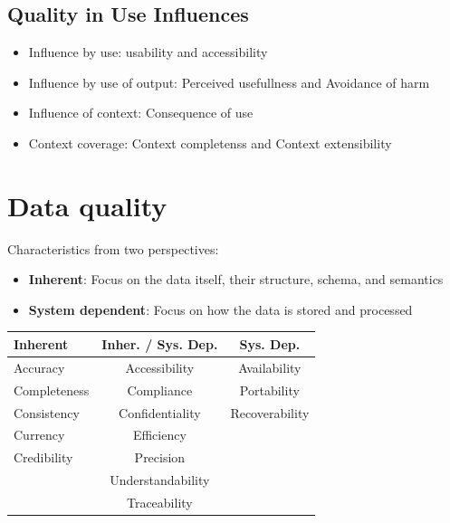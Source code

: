\subsection{Quality in Use Influences}
\begin{itemize}
  \item Influence by use: usability and accessibility
  \item Influence by use of output: Perceived usefullness and Avoidance of harm
  \item Influence of context: Consequence of use
  \item Context coverage: Context completenss and Context extensibility
\end{itemize}


\section{Data quality}
Characteristics from two perspectives:

\begin{itemize}
  \item \textbf{Inherent}: Focus on the data itself, their structure, schema, and semantics
  \item \textbf{System dependent}: Focus on how the data is stored and processed
\end{itemize}

\begin{table}[h!]
  \renewcommand{\arraystretch}{1.4}
  \centering
  \begin{tabular}{l c c}
    \toprule
    \textbf{Inherent} & \textbf{Inher. / Sys. Dep.} & \textbf{Sys. Dep.} \\
    \midrule
    Accuracy          & Accessibility               & Availability       \\
    Completeness      & Compliance                  & Portability        \\
    Consistency       & Confidentiality             & Recoverability     \\
    Currency          & Efficiency                  &                    \\
    Credibility       & Precision                   &                    \\
                      & Understandability           &                    \\
                      & Traceability                &                    \\
    \bottomrule
  \end{tabular}
\end{table}

